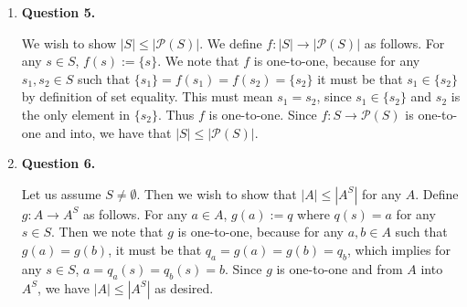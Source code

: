\documentclass{article}
\begin{document}
\begin{enumerate}
\begin{enumerate}
		\end{enumerate}
		
		\item \textbf{Question 5.}
		\medskip
		
		We wish to show $|S| \leq |\mathcal{P}(S)|$. We define $f: |S| \xrightarrow{} |\mathcal{P}(S)|$ as follows.
		For any $s \in S$, $f(s) := \{s\}$. We note that $f$ is one-to-one, because for any $s_1, s_2 \in S$ such that $\{s_1\} = f(s_1) = f(s_2) = \{s_2\}$ it must be that $s_1 \in \{s_2\}$ by definition of set equality. This must mean $s_1 = s_2$, since $s_1 \in \{s_2\}$ and $s_2$ is the only element in $\{s_2\}$. Thus $f$ is one-to-one. Since $f: S \xrightarrow{} \mathcal{P}(S)$ is one-to-one and into, we have that $|S| \leq |\mathcal{P}(S)|$.
		
		\item \textbf{Question 6.}
		\medskip
		
		Let us assume $S \neq \emptyset$. Then we wish to show that $|A| \leq |A^{S}|$ for any $A$. Define $g: A \xrightarrow{} A^{S}$ as follows.
		For any $a \in A$, $g(a) := q$ where $q(s) = a$ for any $s \in S$. Then we note that $g$ is one-to-one, because for any $a,b \in A$ such that $g(a) = g(b)$, it must be that $q_a = g(a) = g(b) = q_b$, which implies for any $s \in S$, $a = q_a(s) = q_b(s) = b$. Since $g$ is one-to-one and from $A$ into $A^{S}$, we have $|A| \leq |A^{S}|$ as desired.
		
		\bigskip

	\end{enumerate}
\end{document}
